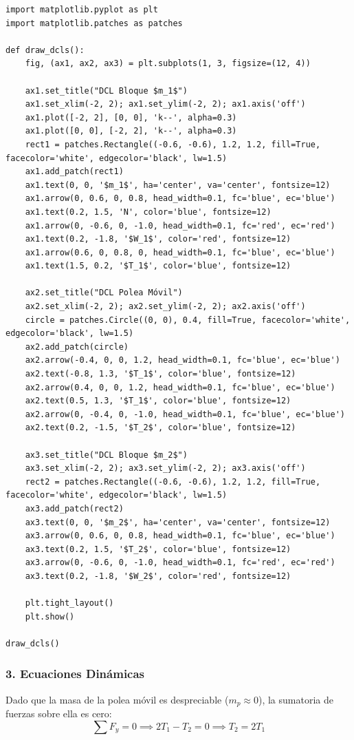 \documentclass[12pt, a4paper]{article}
\begin{document}
\begin{lstlisting}
import matplotlib.pyplot as plt
import matplotlib.patches as patches

def draw_dcls():
    fig, (ax1, ax2, ax3) = plt.subplots(1, 3, figsize=(12, 4))
    
    ax1.set_title("DCL Bloque $m_1$")
    ax1.set_xlim(-2, 2); ax1.set_ylim(-2, 2); ax1.axis('off')
    ax1.plot([-2, 2], [0, 0], 'k--', alpha=0.3)
    ax1.plot([0, 0], [-2, 2], 'k--', alpha=0.3)
    rect1 = patches.Rectangle((-0.6, -0.6), 1.2, 1.2, fill=True, facecolor='white', edgecolor='black', lw=1.5)
    ax1.add_patch(rect1)
    ax1.text(0, 0, '$m_1$', ha='center', va='center', fontsize=12)
    ax1.arrow(0, 0.6, 0, 0.8, head_width=0.1, fc='blue', ec='blue')
    ax1.text(0.2, 1.5, 'N', color='blue', fontsize=12)
    ax1.arrow(0, -0.6, 0, -1.0, head_width=0.1, fc='red', ec='red')
    ax1.text(0.2, -1.8, '$W_1$', color='red', fontsize=12)
    ax1.arrow(0.6, 0, 0.8, 0, head_width=0.1, fc='blue', ec='blue')
    ax1.text(1.5, 0.2, '$T_1$', color='blue', fontsize=12)
    
    ax2.set_title("DCL Polea Móvil")
    ax2.set_xlim(-2, 2); ax2.set_ylim(-2, 2); ax2.axis('off')
    circle = patches.Circle((0, 0), 0.4, fill=True, facecolor='white', edgecolor='black', lw=1.5)
    ax2.add_patch(circle)
    ax2.arrow(-0.4, 0, 0, 1.2, head_width=0.1, fc='blue', ec='blue')
    ax2.text(-0.8, 1.3, '$T_1$', color='blue', fontsize=12)
    ax2.arrow(0.4, 0, 0, 1.2, head_width=0.1, fc='blue', ec='blue')
    ax2.text(0.5, 1.3, '$T_1$', color='blue', fontsize=12)
    ax2.arrow(0, -0.4, 0, -1.0, head_width=0.1, fc='blue', ec='blue')
    ax2.text(0.2, -1.5, '$T_2$', color='blue', fontsize=12)
    
    ax3.set_title("DCL Bloque $m_2$")
    ax3.set_xlim(-2, 2); ax3.set_ylim(-2, 2); ax3.axis('off')
    rect2 = patches.Rectangle((-0.6, -0.6), 1.2, 1.2, fill=True, facecolor='white', edgecolor='black', lw=1.5)
    ax3.add_patch(rect2)
    ax3.text(0, 0, '$m_2$', ha='center', va='center', fontsize=12)
    ax3.arrow(0, 0.6, 0, 0.8, head_width=0.1, fc='blue', ec='blue')
    ax3.text(0.2, 1.5, '$T_2$', color='blue', fontsize=12)
    ax3.arrow(0, -0.6, 0, -1.0, head_width=0.1, fc='red', ec='red')
    ax3.text(0.2, -1.8, '$W_2$', color='red', fontsize=12)

    plt.tight_layout()
    plt.show()

draw_dcls()
\end{lstlisting}

\subsubsection*{3. Ecuaciones Dinámicas}
Dado que la masa de la polea móvil es despreciable ($m_p \approx 0$), la sumatoria de fuerzas sobre ella es cero:
$$ \sum F_y = 0 \implies 2 T_1 - T_2 = 0 \implies T_2 = 2 T_1 $$
\end{document}
